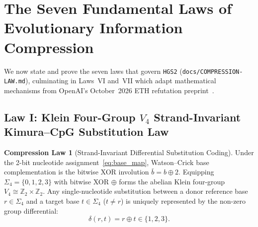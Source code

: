 \documentclass[10pt]{article}
\theoremstyle{definition}
\newtheorem{law}{Compression Law}
\begin{document}
\section{The Seven Fundamental Laws of Evolutionary Information Compression}

We now state and prove the seven laws that govern \texttt{HGS2} (\texttt{docs/COMPRESSION-LAW.md}), culminating in Laws~VI and~VII which adapt mathematical mechanisms from OpenAI's October~2026 ETH refutation preprint~\cite{openai2026eth}.

\subsection{Law I: Klein Four-Group $V_4$ Strand-Invariant Kimura--CpG Substitution Law}

\begin{law}[Strand-Invariant Differential Substitution Coding]
Under the 2-bit nucleotide assignment~\eqref{eq:base_map}, Watson--Crick base complementation is the bitwise XOR involution $\bar{b} = b \oplus 2$. Equipping $\Sigma_4 = \{0,1,2,3\}$ with bitwise XOR $\oplus$ forms the abelian Klein four-group $V_4 \cong \mathbb{Z}_2 \times \mathbb{Z}_2$. Any single-nucleotide substitution between a donor reference base $r \in \Sigma_4$ and a target base $t \in \Sigma_4$ ($t \neq r$) is uniquely represented by the non-zero group differential:
\begin{equation}
  \delta(r, t) = r \oplus t \in \{1, 2, 3\}.
\end{equation}
\end{law}
\end{document}
